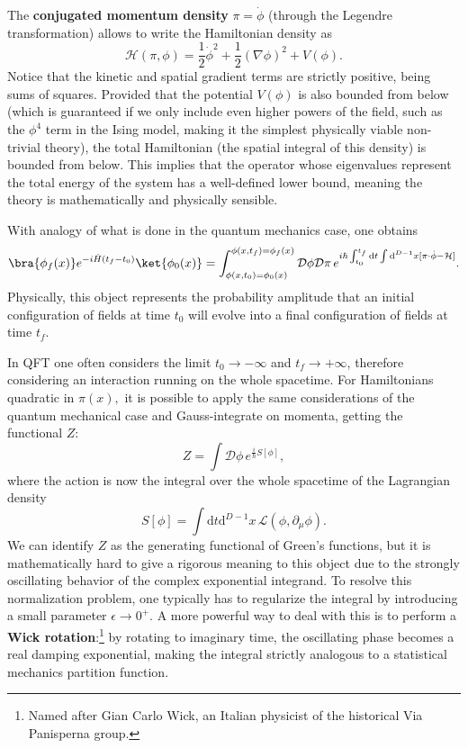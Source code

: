 The \textbf{conjugated momentum density} \(\pi=\dot{\phi}\) (through the Legendre transformation) allows to write the Hamiltonian density as
\[
    \mathcal{H}(\pi,\phi)=\frac{1}{2}\dot{\phi}^{2}+\frac{1}{2}(\nabla\phi)^{2}+V(\phi).
\]
Notice that the kinetic and spatial gradient terms are strictly positive, being sums of squares. Provided that the potential \(V(\phi)\) is also bounded from below (which is guaranteed if we only include even higher powers of the field, such as the \(\phi^4\) term in the Ising model, making it the simplest physically viable non-trivial theory), the total Hamiltonian (the spatial integral of this density) is bounded from below. This implies that the operator whose eigenvalues represent the total energy of the system has a well-defined lower bound, meaning the theory is mathematically and physically sensible.

With analogy of what is done in the quantum mechanics case, one obtains
\[
    \bra{\phi_{f}(x)}e^{-i\hat{H}(t_{f}-t_{0})}\ket{\phi_{0}(x)} = \int_{\phi(x,t_{0}) = \phi_{0}(x)}^{\phi(x,t_{f}) = \phi_{f}(x)}\mathcal{D}\phi\mathcal{D}\pi \, e^{i\hbar\int_{t_{0}}^{t_{f}}\mathrm{d} t\int \mathrm{d}^{D-1} x [\pi\cdot\dot{\phi}-\mathcal{H}]}.
\]
Physically, this object represents the probability amplitude that an initial configuration of fields at time \(t_0\) will evolve into a final configuration of fields at time \(t_f\).

In QFT one often considers the limit \(t_{0}\rightarrow-\infty\) and \(t_{f}\rightarrow+\infty\), therefore considering an interaction running on the whole spacetime.
For Hamiltonians quadratic in \(\pi(x),\) it is possible to apply the same considerations of the quantum mechanical case and Gauss-integrate on momenta, getting the functional \(Z\):
\begin{equation}
    Z=\int\mathcal{D}\phi \, e^{\frac{i}{\hbar}S[\phi]},
    \label{eq:path_integral_qft}
\end{equation}
where the action is now the integral over the whole spacetime of the Lagrangian density
\[
    S[\phi]=\int \mathrm{d} t \mathrm{d}^{D-1}x \, \mathcal{L}(\phi,\partial_{\mu}\phi).
\]
We can identify \(Z\) as the generating functional of Green's functions, but it is mathematically hard to give a rigorous meaning to this object due to the strongly oscillating behavior of the complex exponential integrand. To resolve this normalization problem, one typically has to regularize the integral by introducing a small parameter \(\epsilon \to 0^+\). A more powerful way to deal with this is to perform a \textbf{Wick rotation}:\footnote{Named after Gian Carlo Wick, an Italian physicist of the historical Via Panisperna group.} by rotating to imaginary time, the oscillating phase becomes a real damping exponential, making the integral strictly analogous to a statistical mechanics partition function.

